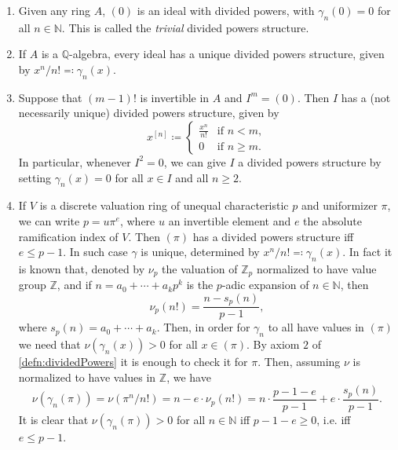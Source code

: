 \begin{ex}\leavevmode\vspace{-.2\baselineskip}
\begin{enumerate}\label{PDexamples}
	\item Given any ring $A$, $(0)$ is an ideal with divided powers,
		with $\gamma_n(0) = 0$ for all $n \in \mathbb{N}$.
		This is called the {\em trivial} divided powers structure.

	\item If $A$ is a $\mathbb{Q}$-algebra, every ideal has a unique
		divided powers structure, given by $x^n/n! \eqqcolon \gamma_n(x)$.

	\item\label{PDEx:NilpotentIdeal} Suppose that $\left( m-1 \right)!$ is invertible in $A$ and 
		$I^m = (0)$.
		Then $I$ has a (not necessarily unique) divided powers structure, given by
		\begin{equation*}
			x^{[n]} \coloneqq
			\begin{cases}
				\frac{ x^n }{ n! } & \text{if } n < m,\\
				0 & \text{if } n \geq m.
			\end{cases} 
		\end{equation*}
		In particular, whenever $I^2 = 0$, we can give $I$ a
		divided powers structure by setting $\gamma_n(x) = 0$
		for all $x \in I$ and all $n \geq 2$.

	\item\label{PDex:DVR} If $V$ is a discrete valuation ring of unequal characteristic $p$
		and uniformizer $\pi$, we can write $p = u \pi^e$,
		where $u$ an invertible element and $e$ the absolute ramification
		index of $V$.
		Then $\left( \pi \right)$ has a divided powers structure iff $e \leq p-1$.
		In such case $\gamma$ is unique, determined by
		$x^n/n! \eqqcolon \gamma_n(x)$.
		In fact it is known that, denoted by $\nu_p$ the valuation
		of $\mathbb{Z}_{p}$ normalized to have value group $\mathbb{Z}$,
		and if $n = a_0 + \cdots + a_kp^k$ is the $p$-adic expansion
		of $n \in \mathbb{N}$, then
		\begin{equation*}
			\nu_p(n!) = 
			\frac{n - s_p(n)}{p-1}
		,\end{equation*}
		where $s_p(n) = a_0 + \cdots + a_k$.
		Then, in order for $\gamma_n$ to all have values in $(\pi)$
		we need that $\nu(\gamma_n(x)) > 0$ for all $x \in (\pi)$.
		By axiom $2$ of \cref{defn:dividedPowers}
		it is enough to check it for $\pi$.
		Then, assuming $\nu$ is normalized to have values in $\mathbb{Z}$,
		we have
		\begin{equation*}
			\nu(\gamma_n(\pi)) = \nu(\pi^n/n!) =
			n - e \cdot \nu_p(n!) =
			n \cdot \frac{p - 1 - e}{p - 1} + e \cdot \frac{s_p(n)}{p - 1}
		.\end{equation*}
		It is clear that $\nu(\gamma_n(\pi)) > 0$ for all $n \in \mathbb{N}$
		iff $p - 1 - e \geq 0$, i.e. iff $e \leq p - 1$.
\end{enumerate}
\end{ex} 


